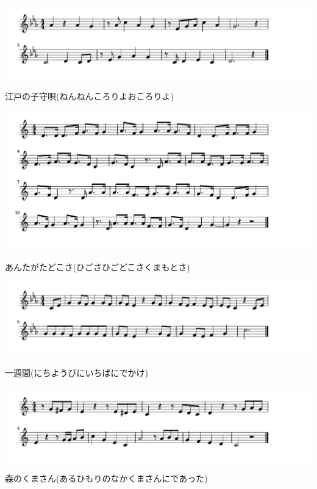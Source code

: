 \documentclass[a4paper]{ltjsarticle}
\begin{document}
\includegraphics[clip]{edokomori_crop.pdf}

\vspace{-10mm} \hspace{10mm}
江戸の子守唄(ねんねんころりよおころりよ)

\includegraphics[clip]{antagata_crop.pdf}

\vspace{-10mm} \hspace{10mm}
あんたがたどこさ(ひごさひごどこさくまもとさ)

\includegraphics[clip]{isshukan_crop.pdf}

\vspace{-10mm} \hspace{10mm}
一週間(にちようびにいちばにでかけ)

\includegraphics[clip]{morinokuma_crop.pdf}

\vspace{-10mm} \hspace{10mm}
森のくまさん(あるひもりのなかくまさんにであった)
\end{document}
